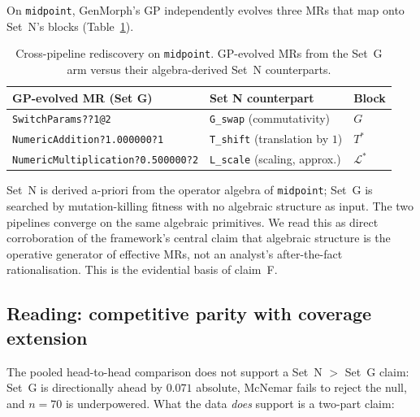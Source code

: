On \texttt{midpoint}, GenMorph's GP independently evolves three MRs
that map onto Set~N's blocks (Table~\ref{tab:rediscovery}).

\begin{table}[h]
\centering
\caption{Cross-pipeline rediscovery on \texttt{midpoint}. GP-evolved
MRs from the Set~G arm versus their algebra-derived Set~N
counterparts.}
\label{tab:rediscovery}
\small
\begin{tabular}{lll}
\toprule
GP-evolved MR (Set G) & Set N counterpart & Block \\
\midrule
\texttt{SwitchParams??1@2}              & \texttt{G\_swap}  (commutativity)        & $G$ \\
\texttt{NumericAddition?1.000000?1}     & \texttt{T\_shift} (translation by $1$)   & $T^{*}$ \\
\texttt{NumericMultiplication?0.500000?2} & \texttt{L\_scale} (scaling, approx.)   & $\mathcal{L}^{*}$ \\
\bottomrule
\end{tabular}
\end{table}

Set~N is derived a-priori from the operator algebra of
\texttt{midpoint}; Set~G is searched by mutation-killing fitness with
no algebraic structure as input. The two pipelines converge on the
same algebraic primitives. We read this as direct corroboration of
the framework's central claim that algebraic structure is the
operative generator of effective MRs, not an analyst's after-the-fact
rationalisation. This is the evidential basis of claim~F.

\subsection{Reading: competitive parity with coverage extension}
\label{subsec:reframing}

The pooled head-to-head comparison does not support a
Set~N $>$ Set~G claim: Set~G is directionally ahead by $0.071$
absolute, McNemar fails to reject the null, and $n = 70$ is
underpowered. What the data \emph{does} support is a two-part claim:

